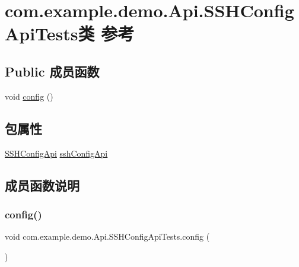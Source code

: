 \hypertarget{classcom_1_1example_1_1demo_1_1_api_1_1_s_s_h_config_api_tests}{}\section{com.\+example.\+demo.\+Api.\+S\+S\+H\+Config\+Api\+Tests类 参考}
\label{classcom_1_1example_1_1demo_1_1_api_1_1_s_s_h_config_api_tests}
\subsection*{Public 成员函数}
\begin{DoxyCompactItemize}
\item 
void \mbox{\hyperlink{classcom_1_1example_1_1demo_1_1_api_1_1_s_s_h_config_api_tests_afb369a198dd43e593fd47e2ec3a5882e}{config}} ()
\end{DoxyCompactItemize}
\subsection*{包属性}
\begin{DoxyCompactItemize}
\item 
\mbox{\hyperlink{classcom_1_1example_1_1demo_1_1configplatform_1_1_s_s_h_config_api}{S\+S\+H\+Config\+Api}} \mbox{\hyperlink{classcom_1_1example_1_1demo_1_1_api_1_1_s_s_h_config_api_tests_acde47f3a1798455725c07a350acfe06f}{ssh\+Config\+Api}}
\end{DoxyCompactItemize}


\subsection{成员函数说明}
\mbox{\label{classcom_1_1example_1_1demo_1_1_api_1_1_s_s_h_config_api_tests_afb369a198dd43e593fd47e2ec3a5882e}} 
\subsubsection{\texorpdfstring{config()}{config()}}
{\footnotesize\ttfamily void com.\+example.\+demo.\+Api.\+S\+S\+H\+Config\+Api\+Tests.\+config (\begin{DoxyParamCaption}{ }\end{DoxyParamCaption})}



